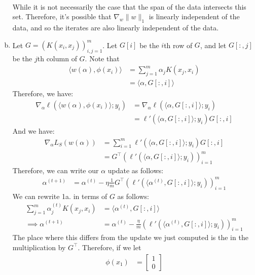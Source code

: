 \documentclass{amsart}
\theoremstyle{definition}
\begin{document}
\begin{enumerate}[(a)]
\begin{align*}
    \end{align*}
    While it is not necessarily the case that the span of the data intersects this set. 
    Therefore, it's possible that $\nabla_w \|w\|_1$ is linearly independent of the data, and so the iterates are also linearly independent of the data. 
  \item 
    Let $G = (K(x_i, x_j))_{i,j=1}^{m}$. Let $G[i]$ be the $i$th row of $G$, and let $G[:, j]$ be the $j$th column of $G$.
    Note that 
    \begin{align*}
      \langle w(\alpha), \phi(x_i) \rangle &= \sum_{j=1}^{m} \alpha_j K(x_j, x_i)\\
      &= \langle \alpha, G[:, i] \rangle
    \end{align*}
    Therefore, we have:
    \begin{align*}
      \nabla_\alpha \ell(\langle w(\alpha), \phi(x_i)\rangle; y_i) &= \nabla_\alpha \ell(\langle \alpha, G[:, i] \rangle; y_i)\\
      &= \ell'(\langle \alpha, G[:, i] \rangle; y_i) G[:, i]
    \end{align*}
    And we have:
    \begin{align*}
      \nabla_\alpha L_S(w(\alpha)) &= \sum_{i=1}^{m}\ell'(\langle \alpha, G[:, i] \rangle; y_i) G[:, i]\\
      &= G^\top (\ell'(\langle \alpha, G[:, i] \rangle; y_i))_{i=1}^{m}
    \end{align*}
    Therefore, we can write our $\alpha$ update as follows:
    \begin{align*}
      \alpha^{(t+1)} &= \alpha^{(t)} - \eta \frac{1}{m} G^\top (\ell'(\langle \alpha^{(t)}, G[:, i] \rangle; y_i))_{i=1}^{m}
    \end{align*}
    We can rewrite 1a. in terms of $G$ as follows:
    \begin{align*}
      \sum_{j=1}^{m} \alpha_j^{(t)} K(x_j, x_i) &= \langle \alpha^{(t)}, G[:, i] \rangle\\
      \implies \alpha^{(t+1)} &= \alpha^{(t)} - \frac{\eta}{m} (\ell'(\langle \alpha^{(t)}, G[:, i] \rangle; y_i) )_{i=1}^{m}
    \end{align*}
    The place where this differs from the update we just computed is the in the multiplication by $G^\top$.
    Therefore, if we let
    \begin{align*}
      \phi(x_1) &= \begin{bmatrix}
        1\\
        0
      \end{bmatrix}\\

\end{align*}
\end{enumerate}
\end{document}
